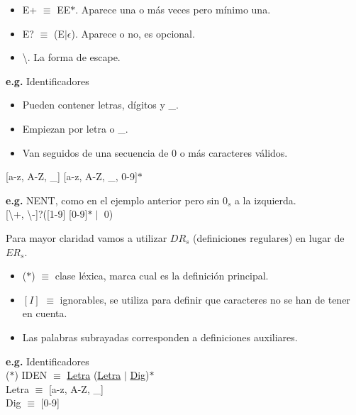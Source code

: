 \documentclass[\main/Apuntes_PL.tex]{subfiles}
\begin{document}
\begin{itemize}
\begin{itemize}
\begin{itemize}
                        \par
                        e.g. [$^\wedge$0-9, a-z] es el conjunto de caracteres que no son dígitos ni letras minúsculas.
                    \item E+ $\equiv$ EE$\ast$. Aparece una o más veces pero mínimo una.
                    \item E? $\equiv$ (E$\mid\epsilon$). Aparece o no, es opcional.
                    \item \textbackslash. La forma de escape.
                  \end{itemize}
              \end{itemize}
      \end{itemize}

      \bigskip
      \par
      \textbf{e.g.} Identificadores
      \begin{itemize}
      \item Pueden contener letras, dígitos y \_.
      \item Empiezan por letra o \_.
      \item Van seguidos de una secuencia de 0 o más caracteres válidos.
      \end{itemize}
      \hspace{5mm}[a-z, A-Z, \_] [a-z, A-Z, \_, 0-9]$\ast$

      \bigskip
      \par
      \textbf{e.g.} NENT, como en el ejemplo anterior pero sin $0_s$ a la izquierda.\\
      \hspace{5mm} [\textbackslash+, \textbackslash -]?([1-9] [0-9]$\ast \mid$ 0)

      \newpage
      \par
      Para mayor claridad vamos a utilizar $DR_s$ (definiciones regulares) en lugar de $ER_s$.
      \begin{itemize}
        \item ($\ast$) $\equiv$ clase léxica, marca cual es la definición principal.
        \item $[I]$ $\equiv$ ignorables, se utiliza para definir que caracteres no se han de tener en cuenta.
        \item Las palabras subrayadas corresponden a definiciones auxiliares.
      \end{itemize}

      \bigskip
      \par
      \textbf{e.g.} Identificadores\\
      \hspace{5mm}($\ast$) IDEN $\equiv$ \underline{Letra} (\underline{Letra} $\mid$ \underline{Dig})$\ast$ \\
      \hspace{10mm} Letra $\equiv$ [a-z, A-Z, \_] \\
      \hspace{10mm} Dig $\equiv$ [0-9]
\end{document}
